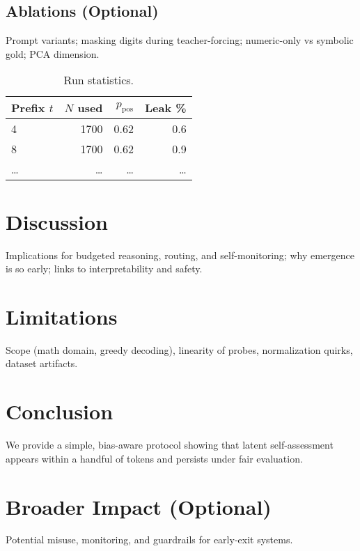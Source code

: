 \documentclass[10pt,a4paper,twocolumn]{article}
\begin{document}
\subsection{Ablations (Optional)}
Prompt variants; masking digits during teacher-forcing; numeric-only vs symbolic gold; PCA dimension.

\begin{table}[t]
  \centering
  \caption{Run statistics.\vspace{2pt}}
  \begin{tabular}{lrrr}
  \toprule
  Prefix $t$ & $N$ used & $p_{\text{pos}}$ & Leak \% \\
  \midrule
  4 & 1700 & 0.62 & 0.6 \\
  8 & 1700 & 0.62 & 0.9 \\
  \dots & \dots & \dots & \dots \\
  \bottomrule
  \end{tabular}
  \label{tab:stats}
\end{table}

\section{Discussion}
\label{sec:discussion}
Implications for budgeted reasoning, routing, and self-monitoring; why emergence is so early; links to interpretability and safety.

\section{Limitations}
\label{sec:limitations}
Scope (math domain, greedy decoding), linearity of probes, normalization quirks, dataset artifacts.

\section{Conclusion}
\label{sec:conclusion}
We provide a simple, bias-aware protocol showing that latent self-assessment appears within a handful of tokens and persists under fair evaluation.

\section*{Broader Impact (Optional)}
Potential misuse, monitoring, and guardrails for early-exit systems.
\end{document}
